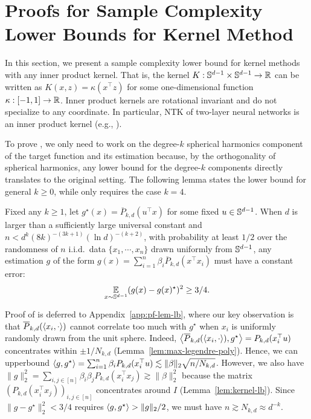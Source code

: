 \section{Proofs for Sample Complexity Lower Bounds for Kernel Method}\label{app:lb-sketch}
In this section, we present a sample complexity lower bound for kernel methods with any inner product kernel. That is, the kernel $K:\mathbb{S}^{d-1}\times\mathbb{S}^{d-1}\to \mathbb{R}$ can be written as $K(x,z)=\kappa(x^\top z)$ for some one-dimensional function $\kappa:[-1,1]\to\mathbb{R}$. Inner product kernels are rotational invariant and do not specialize to any coordinate. In particular, NTK of two-layer neural networks is an inner product kernel (e.g., \citet{du2018gradient,wei2019regularization}).

To prove , we only need to work on the degree-$k$ spherical harmonics component of the target function and its estimation because, by the orthogonality of spherical harmonics, any lower bound for the degree-$k$ components directly translates to the original setting. The following lemma states the lower bound for general $k\ge 0$, while  only requires the case $k=4.$
\begin{lemma}\label{lem:lb-technical-main}
    Fixed any $k\ge 1$, let $g^\star(x)=\overline{P}_{k,d}(u^\top x)$ for some fixed $u\in\mathbb{S}^{d-1}$. When $d$ is larger than a sufficiently large universal constant and $n<d^k(8k)^{-(3k+1)}(\ln d)^{-(k+2)}$, with probability at least $1/2$ over the randomness of $n$ i.i.d.~data $\{x_1,\cdots,x_n\}$ drawn uniformly from $\mathbb{S}^{d-1}$, any estimation $g$ of the form $g(x)=\sum_{i=1}^{n}\beta_i \overline{P}_{k,d}(x^\top x_i)$ must have a constant error:
    \begin{align}
        \operatorname*{\mathbb{E}}_{x\sim \mathbb{S}^{d-1}}(g(x)-g(x)^\star)^2\ge 3/4.
    \end{align}
\end{lemma}
Proof of  is deferred to Appendix~\ref{app:pf-lem-lb}, where our key observation is that $\overline{P}_{k, d}(\left<x_i, \cdot\right>)$ cannot correlate too much with $g^\star$ when $x_i$ is uniformly randomly drawn from the unit sphere. Indeed, $\left<\overline{P}_{k, d}(\left<x_i, \cdot\right>), g^\star\right>=P_{k,d}(x_i^\top u)$ concentrates within $\pm 1/N_{k,d}$ (Lemma~\ref{lem:max-legendre-poly}). Hence, we can upperbound $\left<g, g^\star\right>=\sum_{i=1}^{n}\beta_i P_{k,d}(x_i^\top u)\lesssim \|\beta\|_2\sqrt{n/N_{k,d}}$. However, we also have $\|g\|_2^2=\sum_{i,j\in [n]}\beta_i\beta_jP_{k,d}(x_i^\top x_j)\gtrsim \|\beta\|_2^2$ because the matrix $(P_{k,d}(x_i^\top x_j))_{i,j\in[n]}$ concentrates around $I$ (Lemma~\ref{lem:kernel-lb}). Since $\|g-g^\star\|_2^2<3/4$ requires $\left<g, g^\star\right>> \|g\|_2/2$, we must have $n\gtrsim N_{k,d}\approx d^{-k}$.

